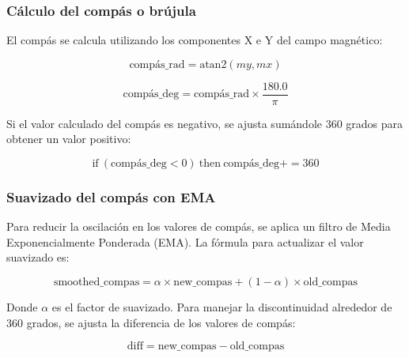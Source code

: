         \subsubsection{Cálculo del compás o brújula}\vspace{5px}

            El compás se calcula utilizando los componentes X e Y del campo magnético:
            \vspace{5px}

            \[
            \text{compás\_rad} = \text{atan2}(my, mx)
            \]

            \[
            \text{compás\_deg} = \text{compás\_rad} \times \frac{180.0}{\pi}
            \]

            \vspace{5px}
            Si el valor calculado del compás es negativo, se ajusta sumándole 360 grados para obtener un valor positivo:
            \vspace{5px}

            \[
            \text{if} \ (\text{compás\_deg} < 0) \ \text{then} \ \text{compás\_deg} += 360
            \]\vspace{5px}

        \subsubsection{Suavizado del compás con EMA}\vspace{5px}

            Para reducir la oscilación en los valores de compás, se aplica un filtro de Media Exponencialmente Ponderada (EMA). La fórmula para actualizar el valor suavizado es:\vspace{5px}
        

            \[
            \text{smoothed\_compas} = \alpha \times \text{new\_compas} + (1 - \alpha) \times \text{old\_compas}
            \]\vspace{5px}

            Donde \(\alpha\) es el factor de suavizado. Para manejar la discontinuidad alrededor de 360 grados, se ajusta la diferencia de los valores de compás:\vspace{5px}

            \begin{equation}
                \text{diff} = \text{new\_compas} - \text{old\_compas}
            \end{equation}
                
